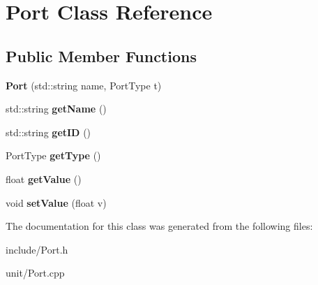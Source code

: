 \hypertarget{classPort}{}\section{Port Class Reference}
\label{classPort}
\subsection*{Public Member Functions}
\begin{DoxyCompactItemize}
\item 
{\bfseries Port} (std\+::string name, Port\+Type t)\hypertarget{classPort_aadff8efe873e31b3362dda2b4a28c8c9}{}\label{classPort_aadff8efe873e31b3362dda2b4a28c8c9}

\item 
std\+::string {\bfseries get\+Name} ()\hypertarget{classPort_ad2c3baf0b291aee3b5b65178231754a6}{}\label{classPort_ad2c3baf0b291aee3b5b65178231754a6}

\item 
std\+::string {\bfseries get\+ID} ()\hypertarget{classPort_a31744528a5ade68a59ce094f3797bc1e}{}\label{classPort_a31744528a5ade68a59ce094f3797bc1e}

\item 
Port\+Type {\bfseries get\+Type} ()\hypertarget{classPort_a5859f5d788d56c0103f4274b6d62b725}{}\label{classPort_a5859f5d788d56c0103f4274b6d62b725}

\item 
float {\bfseries get\+Value} ()\hypertarget{classPort_a101b9cfba62777fb61c35a642b63f25a}{}\label{classPort_a101b9cfba62777fb61c35a642b63f25a}

\item 
void {\bfseries set\+Value} (float v)\hypertarget{classPort_afc93a217ba756e559c157b66745823a7}{}\label{classPort_afc93a217ba756e559c157b66745823a7}

\end{DoxyCompactItemize}


The documentation for this class was generated from the following files\+:\begin{DoxyCompactItemize}
\item 
include/Port.\+h\item 
unit/Port.\+cpp\end{DoxyCompactItemize}
